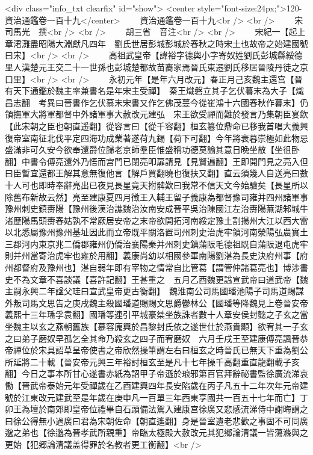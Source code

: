 <div class="info_txt clearfix" id="show">
<center style="font-size:24px;">120-資治通鑑卷一百十九</center>
  　　資治通鑑卷一百十九<br />
<br />
　　宋　司馬光　撰<br />
<br />
　　胡三省　音注<br />
<br />
　　宋紀一【起上章涒灘盡昭陽大淵獻凡四年　劉氏世居彭城彭城於春秋之時宋土也故帝之始建國號曰宋】<br />
<br />
　　高祖武皇帝【諱裕字德輿小字寄奴姓劉氏彭城縣綏德里人漢楚元王交二十一世孫也彭城楚都故苗裔家焉晉氏東遷劉氏移居晉陵丹徒之京口里】<br />
<br />
　　永初元年【是年六月改元】春正月己亥魏主還宫【晉有天下通鑑於魏主率兼書名是年宋主受禪】　秦王熾磐立其子乞伏暮末為大子【熾昌志翻　考異曰晉書作乞伏慕末宋書又作乞佛茂蔓今從崔鴻十六國春秋作暮末】仍領撫軍大將軍都督中外諸軍事大赦改元建弘　宋王欲受禪而難於發言乃集朝臣宴飲【此宋朝之臣也朝直遥翻】從容言曰【從千容翻】桓玄簒位鼎命已移我首唱大義興復帝室南征北伐平定四海功成業著遂荷九錫【荷下可翻】今年將衰暮崇極如此物忌盛滿非可久安今欲奉還爵位歸老京師羣臣惟盛稱功德莫諭其意日晩坐散【坐徂卧翻】中書令傅亮還外乃悟而宫門已閉亮叩扉請見【見賢遍翻】王即開門見之亮入但曰臣暫宜還都王解其意無復他言【解戶買翻曉也復扶又翻】直云須幾人自送亮曰數十人可也即時奉辭亮出已夜見長星竟天拊髀歎曰我常不信天文今始驗矣【長星所以除舊布新故云然】亮至建康夏四月徵王入輔王留子義康為都督豫司雍并四州諸軍事豫州刺史鎮夀陽【豫州後漢治譙魏治汝南安成晉平吳治陳國江左治夀陽蕪湖邾城牛渚歷陽馬頭夀春姑孰不常厥居安帝之末帝欲開拓河南綏定豫土割揚州大江以西大雷以北悉屬豫州豫州基址因此而立帝既平關洛置司州刺史治虎牢領河南滎陽弘農實土三郡河内東京兆二僑郡雍州仍僑治襄陽秦并州刺史鎮蒲阪毛德祖既自蒲阪退屯虎牢則并州當寄治虎牢也雍於用翻】義康尚幼以相國參軍南陽劉湛為長史決府州事【府州都督府及豫州也】湛自弱年即有宰物之情常自比管葛【謂管仲諸葛亮也】博涉書史不為文章不喜談議【喜許記翻】王甚重之　五月乙酉魏更諡宣武帝曰道武帝【魏主嗣永興二年諡父珪曰宣武皇帝更古衡翻】　魏淮南公司馬國璠池陽子司馬道賜謀外叛司馬文思告之庚戌魏主殺國璠道賜賜文思爵鬱林公【國璠等降魏見上卷晉安帝義熙十三年璠孚袁翻】國璠等連引平城豪桀坐族誅者數十人章安侯封懿之子玄之當坐魏主以玄之燕朝舊族【慕容廆興於昌黎封氏依之遂世仕於燕貴顯】欲宥其一子玄之曰弟子磨奴早孤乞全其命乃殺玄之四子而宥磨奴　六月壬戌王至建康傅亮諷晉恭帝禪位於宋具詔草呈帝使書之帝欣然操筆謂左右曰桓玄之時晉氏已無天下重為劉公所延將二十載【晉安帝元興三年裕討桓玄至是凡十七年操千高翻重直龍翻載子亥翻】今日之事本所甘心遂書赤紙為詔甲子帝遜於琅邪第百官拜辭祕書監徐廣流涕哀慟【晉武帝泰始元年受禪歲在乙酉建興四年長安陷歲在丙子凡五十二年次年元帝建號於江東改元建武至是年歲在庚申凡一百單三年西東享國共一百五十七年而亡】丁卯王為壇於南郊即皇帝位禮畢自石頭備法駕入建康宫徐廣又悲感流涕侍中謝晦謂之曰徐公得無小過廣曰君為宋朝佐命【朝直遙翻】身是晉室遺老悲歡之事固不可同廣邈之弟也【徐邈為晉孝武所親重】帝臨太極殿大赦改元其犯鄉論清議一皆蕩滌與之更始【犯郷論清議盖得罪於名教者更工衡翻】<br />
